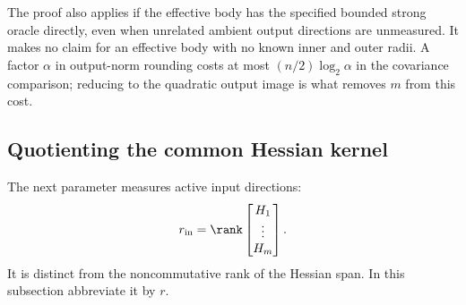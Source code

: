 The proof also applies if the effective body has the specified bounded
strong oracle directly, even when unrelated ambient output directions
are unmeasured. It makes no claim for an effective body with no known
inner and outer radii. A factor $\alpha$ in output-norm rounding costs
at most $(n/2)\log_2\alpha$ in the covariance comparison; reducing to
the quadratic output image is what removes $m$ from this cost.

\subsection{Quotienting the common Hessian kernel}

The next parameter measures active input directions:
\[
 r_{\rm in}=\rank\begin{bmatrix}H_1\\ \vdots\\H_m\end{bmatrix}.
\]
It is distinct from the noncommutative rank of the Hessian span. In this
subsection abbreviate it by $r$.

